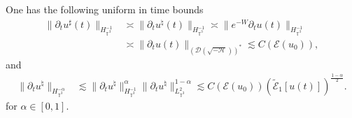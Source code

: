 \begin{lem}
  One has the following uniform in time bounds
  \begin{equation}
  \begin{split}
    \| \partial_t u^{\sharp} (t) \|_{H_{\mathbb{T}^3}^{- 1}} & \asymp  \|
    \partial_t u^{\natural} (t) \|_{H_{\mathbb{T}^3}^{- 1}} \asymp \| e^{- W}
    \partial_t u (t) \|_{H_{\mathbb{T}^3}^{- 1}}\\
    & \asymp \| \partial_t u (t)
    \|_{\left( \mathcal{D} \left( \sqrt{- \mathcal{H}} \right) \right)^{\ast}}
    \lesssim C (\mathcal{E} (u_0)), \label{dtu-equiv}
    \end{split}
  \end{equation}
  and
  \begin{eqnarray}
    \| \partial_t u^{\natural} \|_{H_{\mathbb{T}^3}^{- \alpha}} & \lesssim \|
    \partial_t u^{\natural} \|^{\alpha}_{H_{\mathbb{T}^3}^{- 1}} \| \partial_t
    u^{\natural} \|^{1 - \alpha}_{L_{\mathbb{T}^3}^2} \lesssim C (\mathcal{E}
    (u_0)) (\tilde{\mathcal{E}}_1 [u (t)])^{\frac{1 - \alpha}{2}}. \label{dtu-inter} 
  \end{eqnarray}
for $\alpha \in [0, 1]$.
\end{lem}
